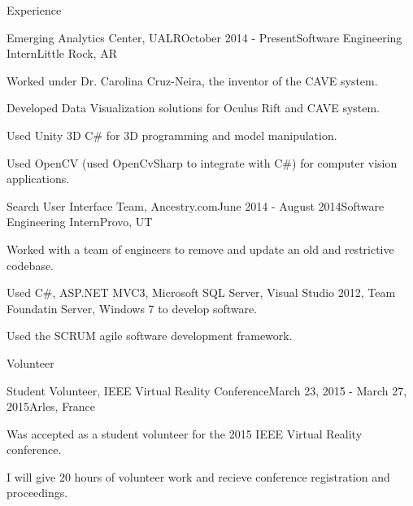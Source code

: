 \documentclass{resume} %
\begin{document}
\begin{rSection}{Experience}

\begin{rSubsection}{Emerging Analytics Center, UALR}{October 2014 - Present}{Software Engineering Intern}{Little Rock, AR}

	\item Worked under Dr. Carolina Cruz-Neira, the inventor of the CAVE system.
	\item Developed Data Visualization solutions for Oculus Rift and CAVE system.
	\item Used Unity 3D C\# for 3D programming and model manipulation.
	\item Used OpenCV (used OpenCvSharp to integrate with C\#) for computer vision applications.
\end{rSubsection}

\begin{rSubsection}{Search User Interface Team, Ancestry.com}{June 2014 - August 2014}{Software Engineering Intern}{Provo, UT}

    \item Worked with a team of engineers to remove and update an old and restrictive codebase.
    \item Used C\#, ASP.NET MVC3, Microsoft SQL Server, Visual Studio 2012, Team Foundatin Server, Windows 7 to develop software.
	\item Used the SCRUM agile software development framework.
\end{rSubsection}

\end{rSection}

\begin{rSection}{Volunteer}

	\begin{rSubsection}{Student Volunteer, IEEE Virtual Reality Conference}{March 23, 2015 - March 27, 2015}{Arles, France}

		\item Was accepted as a student volunteer for the 2015 IEEE Virtual Reality conference.
		\item I will give 20 hours of volunteer work and recieve conference registration and proceedings.
	\end{rSubsection}

\end{rSection}

\end{document}
